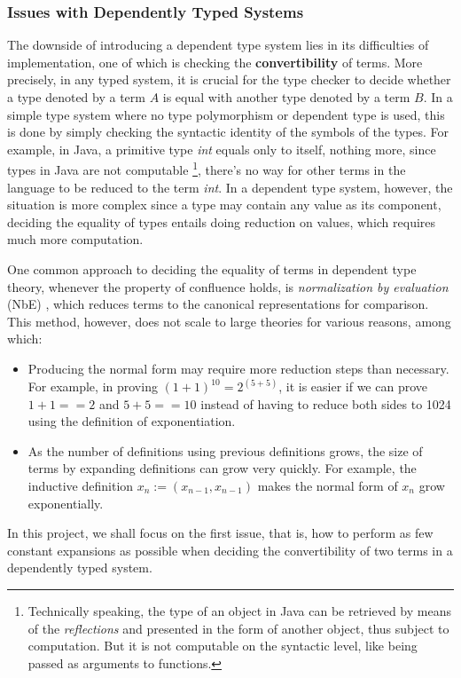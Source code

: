 \documentclass{article}
\theoremstyle{remark}
\begin{document}
\subsubsection{Issues with Dependently Typed Systems}
The downside of introducing a dependent type system lies in its difficulties of implementation, one of which is checking the \textbf{convertibility} of terms. More precisely, in any typed system, it is crucial for the type checker to decide whether a type denoted by a term $A$ is equal with another type denoted by a term $B$. In a simple type system where no type polymorphism or dependent type is used, this is done by simply checking the syntactic identity of the symbols of the types. For example, in Java, a primitive type \emph{int} equals only to itself, nothing more, since types in Java are not computable \footnote{Technically speaking, the type of an object in Java can be retrieved by means of the \emph{reflections} and presented in the form of another object, thus subject to computation. But it is not computable on the syntactic level, like being passed as arguments to functions.}, there's no way for other terms in the language to be reduced to the term \emph{int}. In a dependent type system, however, the situation is more complex since a type may contain any value as its component, deciding the equality of types entails doing reduction on values, which requires much more computation.

One common approach to deciding the equality of terms in dependent type theory, whenever the property of confluence holds, is \textit{normalization by evaluation} (NbE) \cite{berger1998normalization}, which reduces terms to the canonical representations for comparison. This method, however, does not scale to large theories for various reasons, among which:
\begin{itemize}
\item Producing the normal form may require more reduction steps than necessary. For example, in proving $(1 + 1) ^ {10} = 2 ^{(5 + 5)}$, it is easier if we can prove $1 + 1 == 2$ and $5 + 5 == 10$ instead of having to reduce both sides to 1024 using the definition of exponentiation.
\item As the number of definitions using previous definitions grows, the size of terms by expanding definitions can grow very quickly. For example, the inductive definition $x_n := (x_{n-1}, x_{n-1})$ makes the normal form of $x_{n}$ grow exponentially.
\end{itemize}
In this project, we shall focus on the first issue, that is, how to perform as few constant expansions as possible when deciding the convertibility of two terms in a dependently typed system. 
\end{document}

